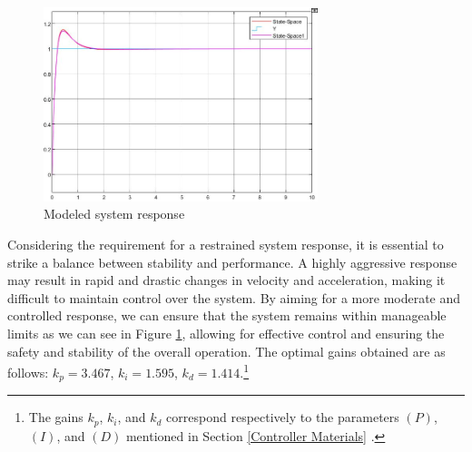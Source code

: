 \begin{center}
    \begin{figure}[ht!]
        \centering
        \includegraphics[width=8cm, keepaspectratio]{imports/Captura2.JPG}
        \caption{Modeled system response}
        \label{fig PID result}
    \end{figure}
\end{center}

Considering the requirement for a restrained system response, it is essential to strike a balance between stability and performance. A highly aggressive response may result in rapid and drastic changes in velocity and acceleration, making it difficult to maintain control over the system. By aiming for a more moderate and controlled response, we can ensure that the system remains within manageable limits as we can see in Figure \ref{fig PID result}, allowing for effective control and ensuring the safety and stability of the overall operation.
The optimal gains obtained are as follows: \( k_p = 3.467 \), \( k_i = 1.595 \), \( k_d = 1.414 \).\footnote{The gains \( k_p \), \( k_i \), and \( k_d \) correspond respectively to the parameters \((P)\), \((I)\), and \((D)\) mentioned in Section \ref{Controller Materials} .
}


